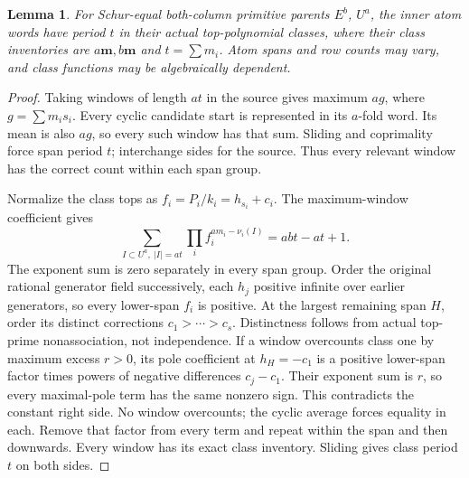 \documentclass[11pt,a4paper]{amsart}
\numberwithin{equation}{section}
\theoremstyle{plain}
\newtheorem{lemma}[theorem]{Lemma}
\theoremstyle{definition}
\begin{document}
\begin{lemma}\label{lem:parallel-class-order}
For Schur-equal both-column primitive parents \(E^b\), \(U^a\), the inner atom words have period \(t\) in their actual top-polynomial classes, where their class inventories are \(a\mathbf m,b\mathbf m\) and \(t=\sum m_i\).  Atom spans and row counts may vary, and class functions may be algebraically dependent.
\end{lemma}
\begin{proof}
Taking windows of length \(at\) in the source gives maximum \(ag\), where \(g=\sum m_i s_i\).  Every cyclic candidate start is represented in its \(a\)-fold word.  Its mean is also \(ag\), so every such window has that sum.  Sliding and coprimality force span period \(t\); interchange sides for the source.  Thus every relevant window has the correct count within each span group.

Normalize the class tops as \(f_i=P_i/k_i=h_{s_i}+c_i\).  The maximum-window coefficient gives
\[
 \sum_{I\subset U^a,\ |I|=at}\prod_i f_i^{am_i-\nu_i(I)}=abt-at+1.
\]
The exponent sum is zero separately in every span group.  Order the original rational generator field successively, each \(h_j\) positive infinite over earlier generators, so every lower-span \(f_i\) is positive.  At the largest remaining span \(H\), order its distinct corrections \(c_1>\cdots>c_s\).  Distinctness follows from actual top-prime nonassociation, not independence.  If a window overcounts class one by maximum excess \(r>0\), its pole coefficient at \(h_H=-c_1\) is a positive lower-span factor times powers of negative differences \(c_j-c_1\).  Their exponent sum is \(r\), so every maximal-pole term has the same nonzero sign.  This contradicts the constant right side.  No window overcounts; the cyclic average forces equality in each.  Remove that factor from every term and repeat within the span and then downwards.  Every window has its exact class inventory.  Sliding gives class period \(t\) on both sides.
\end{proof}
\end{document}
